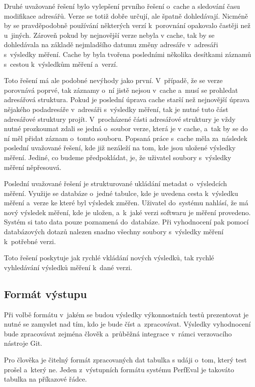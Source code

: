 Druhé uvažované řešení bylo vylepšení prvního řešení o~cache a sledování času modifikace adresářů. Verze se totiž dobře určují,
ale špatně dohledávají. Nicméně by se pravděpodobně používání některých verzí k~porovnání opakovalo častěji než u~jiných.
Zároveň pokud by nejnovější verze nebyla v cache, tak by se dohledávala na základě nejmladšího datumu změny adresáře
v~adresáři s~výsledky měření. Cache by byla tvořena posledními několika desítkami záznamů s~cestou k~výsledkům měření a~verzí.

Toto řešení má ale podobné nevýhody jako první. V~případě, že se verze porovnává poprvé, tak záznamy o~ní jistě nejsou v~cache
a~musí se prohledat adresářová struktura. Pokud je poslední úprava cache starší než nejnovější úprava nějakého podadresáře v~adresáři
s~výsledky měření, tak je nutné tuto část adresářové struktury projít. V~procházené části adresářové struktury je vždy nutné prozkoumat
zdali se jedná o~soubor verze, která je v cache, a~tak by se do ní měl přidat záznam o~tomto souboru. Popsaná práce s~cache měla
za~následek poslední uvažované řešení, kde již nezáleží na tom, kde jsou uložené výsledky měření. Jediné, co budeme předpokládat, je,
že uživatel soubory s~výsledky měření něpřesouvá.

Poslední uvažované řešení je strukturované ukládání metadat o~výsledcích měření. Využije se databáze o~jedné tabulce, kde
je uvedena cesta k~výsledku měření a~verze ke které byl výsledek změřen. Uživatel do~systému nahlásí, že má nový výsledek
měření, kde je uložen, a~k~jaké verzi softwaru je měření provedeno. Systém si tato data pouze poznamená do~databáze. Při
vyhodnocení pak pomocí databázových dotazů nalezen snadno všechny soubory s~výsledky měření k~potřebné verzi.

Toto řešení poskytuje jak rychlé vkládání nových výsledků, tak rychlé vyhledávání výsledků měření k~dané verzi.

\subsection{Formát výstupu}

Při volbě formátu v~jakém se budou výsledky výkonnostních testů prezentovat je nutné se zamyslet nad tím, kdo je bude číst a~zpracovávat.
Výsledky vyhodnocení bude zpracovávat zejména člověk a~průběžná integrace v~rámci verzovacího nástroje Git.

Pro člověka je čitelný formát zpracovaných dat tabulka s udáji o~tom, který test prošel a~který ne.
Jeden z~výstupních formátu systému PerfEval je takováto tabulka na příkazové řádce.

